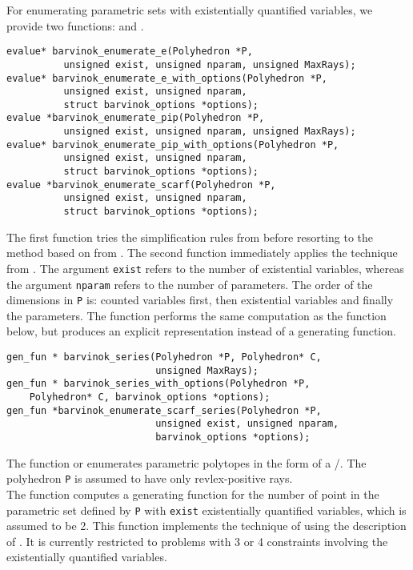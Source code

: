 For enumerating parametric sets with existentially quantified variables,
we provide two functions:
and
.
\begin{verbatim}
evalue* barvinok_enumerate_e(Polyhedron *P,
          unsigned exist, unsigned nparam, unsigned MaxRays);
evalue* barvinok_enumerate_e_with_options(Polyhedron *P, 
          unsigned exist, unsigned nparam,
          struct barvinok_options *options);
evalue *barvinok_enumerate_pip(Polyhedron *P,
          unsigned exist, unsigned nparam, unsigned MaxRays);
evalue* barvinok_enumerate_pip_with_options(Polyhedron *P, 
          unsigned exist, unsigned nparam,
          struct barvinok_options *options);
evalue *barvinok_enumerate_scarf(Polyhedron *P,
          unsigned exist, unsigned nparam,
          struct barvinok_options *options);
\end{verbatim}
The first function tries the simplification rules from
 before resorting to the method
based on  from .
The second function immediately applies the technique from
.
The argument \verb+exist+ refers to the number of existential variables,
whereas
the argument \verb+nparam+ refers to the number of parameters.
The order of the dimensions in \verb+P+ is:
counted variables first, then existential variables and finally
the parameters.
The function  performs the same
computation as the function 
below, but produces an explicit representation instead of a generating function.

\begin{verbatim}
gen_fun * barvinok_series(Polyhedron *P, Polyhedron* C, 
                          unsigned MaxRays);
gen_fun * barvinok_series_with_options(Polyhedron *P,
    Polyhedron* C, barvinok_options *options);
gen_fun *barvinok_enumerate_scarf_series(Polyhedron *P,
                          unsigned exist, unsigned nparam,
                          barvinok_options *options);
\end{verbatim}
The function 
 or
 enumerates parametric polytopes
in the form of a \rgf/.
The polyhedron \verb+P+ is assumed to have only
revlex-positive rays.
\\
The function  computes a
generating function for the number of point in the parametric set
defined by \verb+P+ with \verb+exist+ existentially quantified
variables, which is assumed to be 2.
This function implements the technique of
 using the 
description of .
It is currently restricted to problems with 3 or 4 constraints involving
the existentially quantified variables.

